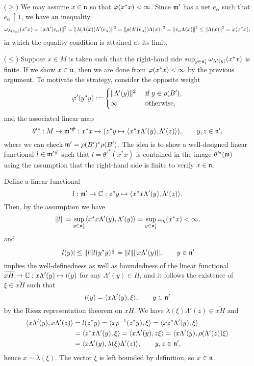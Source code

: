\documentclass{../../../small}
\begin{document}
\begin{pf}
($\ge$)
We may assume $x\in\mathfrak{n}$ so that $\varphi(x^*x)<\infty$.
Since $\mathfrak{m}'$ has a net $e_\alpha$ such that $e_\alpha\uparrow1$, we have an inequality
\[\omega_{\Lambda(e_\alpha)}(x^*x)=\|x\Lambda'(e_\alpha)\|^2=\|\lambda(\Lambda(x))\Lambda'(e_\alpha)\|^2=\|\rho(\Lambda'(e_\alpha))\Lambda(x)\|^2=\|e_\alpha\Lambda(x)\|^2\le\|\Lambda(x)\|^2=\varphi(x^*x),\]
in which the equality condition is attained at its limit.

($\le$)
Suppose $x\in M$ is taken such that the right-hand side $\sup_{y\in\mathfrak{n}'_1}\omega_{\Lambda'(y)}(x^*x)$ is finite.
If we show $x\in\mathfrak{n}$, then we are done from $\varphi(x^*x)<\infty$ by the previous argument.
To motivate the strategy, consider the opposite weight
\[\varphi'(y^*y):=\begin{cases}\|\Lambda'(y)\|^2&\text{ if }y\in\rho(B'),\\\infty&\text{ otherwise},\end{cases}\]
and the associated linear map
\[\theta'^*:M\to\mathfrak{m}'^\#:x^*x\mapsto(z^*y\mapsto\langle x^*x\Lambda'(y),\Lambda'(z)\rangle),\qquad y,z\in\mathfrak{n}',\]
where we can check $\mathfrak{m}'=\rho(B')^*\rho(B')$.
The idea is to show a well-designed linear functional $l\in\mathfrak{m}'^\#$ such that $l=\theta'^*(x^*x)$ is contained in the image $\theta'^*(\mathfrak{m})$ using the assumption that the right-hand side is finite to verify $x\in\mathfrak{n}$.

Define a linear functional
\[l:\mathfrak{m}'\to\mathbb{C}:z^*y\mapsto\langle x^*x\Lambda'(y),\Lambda'(z)\rangle.\]
Then, by the assumption we have
\[\|l\|=\sup_{y\in\mathfrak{n}'_1}\langle x^*x\Lambda'(y),\Lambda'(y)\rangle=\sup_{y\in\mathfrak{n}'_1}\omega_\eta(x^*x)<\infty,\]
and
\[|l(y)|\le\|l\|l(y^*y)^{\frac12}=\|l\|\|x\Lambda'(y)\|,\qquad y\in\mathfrak{n}'\]
implies the well-definedness as well as boundedness of the linear functional $\overline{xH}\to\mathbb{C}:x\Lambda'(y)\mapsto l(y)$ for any $\Lambda'(y)\in H$, and it follows the existence of $\xi\in\bar{xH}$ such that
\[l(y)=\langle x\Lambda'(y),\xi\rangle,\qquad y\in\mathfrak{n}'\]
by the Riesz representation theorem on $\bar{xH}$.
We have $\lambda(\xi)\Lambda'(z)\in\bar{xH}$ and
\begin{align*}
\langle x\Lambda'(y),x\Lambda'(z)\rangle&=l(z^*y)=\langle x\rho^{-1}(z^*y),\xi\rangle=\langle xz^*\Lambda'(y),\xi\rangle\\
&=\langle z^*x\Lambda'(y),\xi\rangle=\langle x\Lambda'(y),z\xi\rangle=\langle x\Lambda'(y),\rho(\Lambda'(z))\xi\rangle\\
&=\langle x\Lambda'(y),\lambda(\xi)\Lambda'(z)\rangle,\qquad y,z\in\mathfrak{n}',
\end{align*}
hence $x=\lambda(\xi)$.
The vector $\xi$ is left bounded by definition, so $x\in\mathfrak{n}$.
\end{pf}
\end{document}
